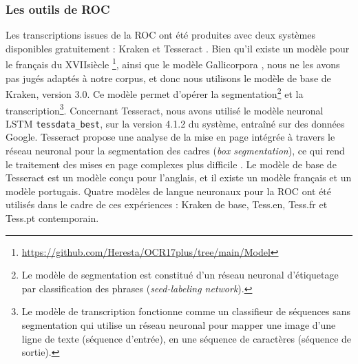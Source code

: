 \subsubsection{Les outils de ROC}
Les transcriptions issues de la ROC ont été produites avec deux systèmes disponibles gratuitement : Kraken \cite{kiessling2019kraken} et Tesseract \cite{smith2007overview}. Bien qu'il existe un modèle pour le français du \textsc{XVII}\ieme{}siècle \cite{gabay:hal-02577236}\footnote{\url{https://github.com/Heresta/OCR17plus/tree/main/Model}}, ainsi que le modèle Gallicorpora \cite{pinche_2022_7410529}, nous ne les avons pas jugés adaptés à notre corpus, et donc nous utilisons le modèle de base de Kraken, version 3.0. Ce modèle permet d'opérer la segmentation\footnote{Le modèle de segmentation est constitué d'un réseau neuronal d'étiquetage par classification des phrases (\textit{seed-labeling network}).
} et la transcription\footnote{Le modèle de transcription fonctionne comme un classifieur de séquences sans segmentation qui utilise un réseau neuronal pour mapper une image d'une ligne de texte (séquence d'entrée), en une séquence de caractères (séquence de sortie). 
}.
Concernant Tesseract, nous avons utilisé le modèle neuronal LSTM \texttt{tessdata\_best}, sur la version 4.1.2 du système, entraîné sur des données Google. Tesseract propose une analyse de la mise en page intégrée à travers le réseau neuronal pour la segmentation des cadres (\textit{box segmentation}), ce qui rend le traitement des mises en page complexes plus difficile \cite{reul2017case}. Le modèle de base de Tesseract est un modèle conçu pour l'anglais, et il existe un modèle français et un modèle portugais. Quatre modèles de langue neuronaux pour la ROC ont été utilisés dans le cadre de ces expériences : Kraken de base, Tess.en, Tess.fr et Tess.pt contemporain.

